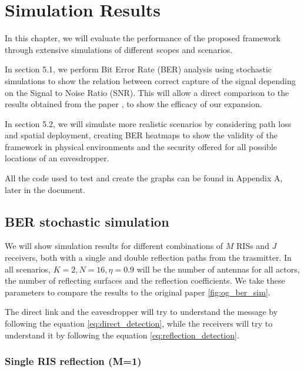 \section{Simulation Results}

In this chapter, we will evaluate the performance of the proposed framework through extensive simulations of different scopes and scenarios.

In section 5.1, we perform Bit Error Rate (BER) analysis using stochastic simulations to show the relation between correct capture of the signal depending on the Signal to Noise Ratio (SNR). This will allow a direct comparison to the results obtained from the paper \cite{9328149}, to show the efficacy of our expansion.

In section 5.2, we will simulate more realistic scenarios by considering path loss and spatial deployment, creating BER heatmaps to show the validity of the framework in physical environments and the security offered for all possible locations of an eavesdropper.

All the code used to test and create the graphs can be found in Appendix A, later in the document.

\subsection{BER stochastic simulation}

We will show simulation results for different combinations of $M$ RISs and $J$ receivers, both with a single and double reflection paths from the trasmitter. In all scenarios, $K = 2, N = 16, \eta = 0.9$ will be the number of antennas for all actors, the number of reflecting surfaces and the reflection coefficients. We take these parameters to compare the results to the original paper \cite{9328149} \ref{fig:og_ber_sim}.

The direct link and the eavesdropper will try to understand the message by following the equation \eqref{eq:direct_detection}, while the receivers will try to understand it by following the equation \eqref{eq:reflection_detection}.

\subsubsection{Single RIS reflection (M=1)}


